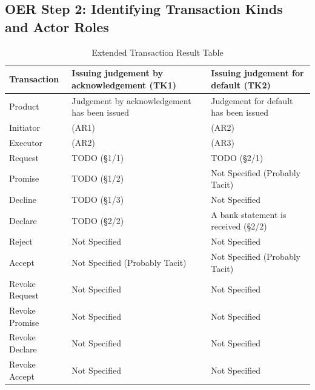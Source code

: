 \begin{landscape}
\section{OER Step 2: Identifying Transaction Kinds and Actor Roles}

\begin{table}[h]
\caption{Extended Transaction Result Table}
\label{tab:etrt}
\begin{tabular}{|l||l|l|}
\hline
Transaction  & Issuing judgement by acknowledgement (TK1) & Issuing judgement for default (TK2) \\ \hline
Product      & Judgement by acknowledgement has been issued  & Judgement for default has been issued \\ \hline
Initiator      &  (AR1)   &  (AR2)\\ \hline
Executor       &  (AR2) &  (AR3)       \\ \hline
Request        & TODO (\S1/1)  & TODO (\S2/1)   \\ \hline
Promise        & TODO (\S1/2)  &  Not Specified (Probably Tacit)   \\ \hline
Decline        &  TODO (\S1/3)  & Not Specified  \\ \hline
Declare        & TODO (\S2/2) & A bank statement is received  (\S2/2) \\ \hline
Reject         &  Not Specified             &  Not Specified   \\ \hline
Accept         & Not Specified (Probably Tacit) &  Not Specified (Probably Tacit) \\ \hline
Revoke Request & Not Specified                   & Not Specified        \\ \hline
Revoke Promise & Not Specified                   &  Not Specified       \\ \hline
Revoke Declare & Not Specified                    &  Not Specified      \\ \hline
Revoke Accept  &  Not Specified             &   Not Specified             \\ \hline
\end{tabular}
\end{table}


\end{landscape}
